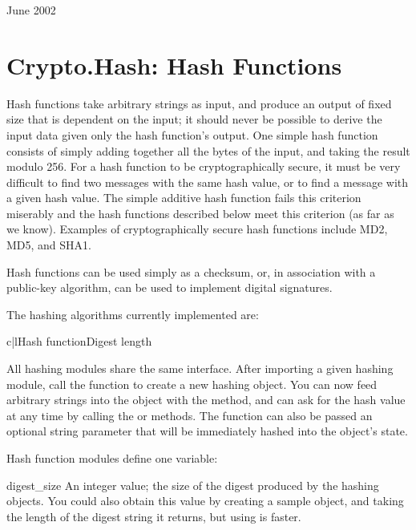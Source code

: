 \documentclass{howto}
\begin{document}
June 2002


\section{Crypto.Hash: Hash Functions}

Hash functions take arbitrary strings as input, and produce an output
of fixed size that is dependent on the input; it should never be
possible to derive the input data given only the hash function's
output.  One simple hash function consists of simply adding together
all the bytes of the input, and taking the result modulo 256.  For a
hash function to be cryptographically secure, it must be very
difficult to find two messages with the same hash value, or to find a
message with a given hash value.  The simple additive hash function
fails this criterion miserably and the hash functions described below
meet this criterion (as far as we know).  Examples of
cryptographically secure hash functions include MD2, MD5, and SHA1.

Hash functions can be used simply as a checksum, or, in association with a
public-key algorithm, can be used to implement digital signatures.
 
The hashing algorithms currently implemented are:

\begin{tableii}{c|l}{}{Hash function}{Digest length}
\end{tableii}

All hashing modules share the same interface.  After importing a given
hashing module, call the  function to create a new
hashing object. You can now feed arbitrary strings into the object
with the  method, and can ask for the hash value at
any time by calling the  or 
methods.  The  function can also be passed an optional
string parameter that will be immediately hashed into the object's
state.

Hash function modules define one variable:

\begin{datadesc}{digest_size}
An integer value; the size of the digest
produced by the hashing objects.  You could also obtain this value by
creating a sample object, and taking the length of the digest string
it returns, but using  is faster.
\end{datadesc}
\end{document}
